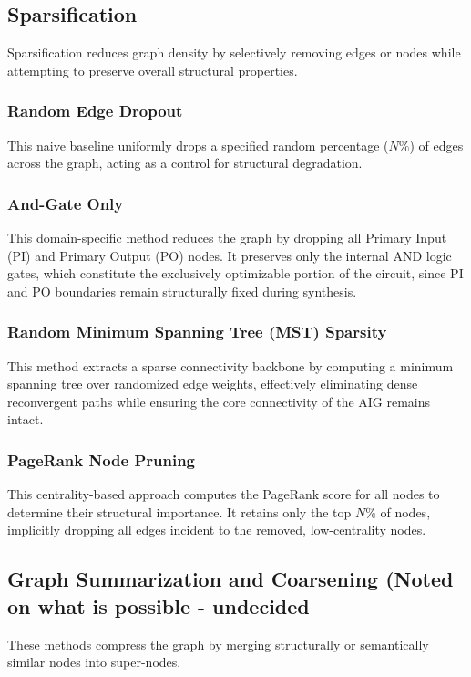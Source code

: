 \documentclass[paper=a4, fontsize=11pt]{scrartcl} %
\numberwithin{equation}{section} %
\numberwithin{figure}{section} %
\numberwithin{table}{section} %
\begin{document}
\subsection{Sparsification}
Sparsification reduces graph density by selectively removing edges or nodes while attempting to preserve overall structural properties.


\subsubsection{Random Edge Dropout}
This naive baseline uniformly drops a specified random percentage ($N\%$) of edges across the graph, acting as a control for structural degradation.


\subsubsection{And-Gate Only}
This domain-specific method reduces the graph by dropping all Primary Input (PI) and Primary Output (PO) nodes. It preserves only the internal AND logic gates, which constitute the exclusively optimizable portion of the circuit, since PI and PO boundaries remain structurally fixed during synthesis.


\subsubsection{Random Minimum Spanning Tree (MST) Sparsity}
This method extracts a sparse connectivity backbone by computing a minimum spanning tree over randomized edge weights, effectively eliminating dense reconvergent paths while ensuring the core connectivity of the AIG remains intact. 



\subsubsection{PageRank Node Pruning}
This centrality-based approach computes the PageRank score for all nodes to determine their structural importance. It retains only the top $N\%$ of nodes, implicitly dropping all edges incident to the removed, low-centrality nodes.


\subsection{Graph Summarization and Coarsening (Noted on what is possible - undecided}
These methods compress the graph by merging structurally or semantically similar nodes into super-nodes.
\end{document}
